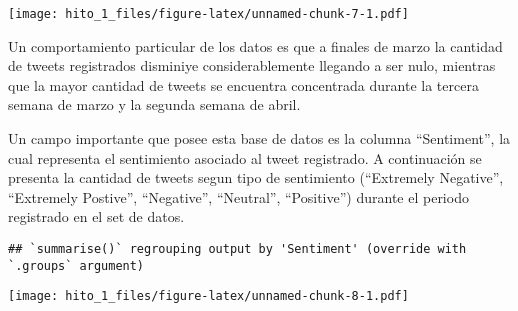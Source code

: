 \documentclass[
]{article}
\newenvironment{Shaded}{\begin{snugshade}}{\end{snugshade}}
\newcommand{\DataTypeTok}[1]{\textcolor[rgb]{0.13,0.29,0.53}{#1}}
\newcommand{\KeywordTok}[1]{\textcolor[rgb]{0.13,0.29,0.53}{\textbf{#1}}}
\newcommand{\NormalTok}[1]{#1}
\newcommand{\OperatorTok}[1]{\textcolor[rgb]{0.81,0.36,0.00}{\textbf{#1}}}
\newcommand{\StringTok}[1]{\textcolor[rgb]{0.31,0.60,0.02}{#1}}
\begin{document}
\texttt{[image: hito\_1\_files/figure-latex/unnamed-chunk-7-1.pdf]}

Un comportamiento particular de los datos es que a finales de marzo la
cantidad de tweets registrados disminiye considerablemente llegando a
ser nulo, mientras que la mayor cantidad de tweets se encuentra
concentrada durante la tercera semana de marzo y la segunda semana de
abril.

Un campo importante que posee esta base de datos es la columna
``Sentiment'', la cual representa el sentimiento asociado al tweet
registrado. A continuación se presenta la cantidad de tweets segun tipo
de sentimiento (``Extremely Negative'', ``Extremely Postive'',
``Negative'', ``Neutral'', ``Positive'') durante el periodo registrado
en el set de datos.

\begin{Shaded}
\end{Shaded}

\begin{verbatim}
## `summarise()` regrouping output by 'Sentiment' (override with `.groups` argument)
\end{verbatim}

\texttt{[image: hito\_1\_files/figure-latex/unnamed-chunk-8-1.pdf]}
\end{document}
